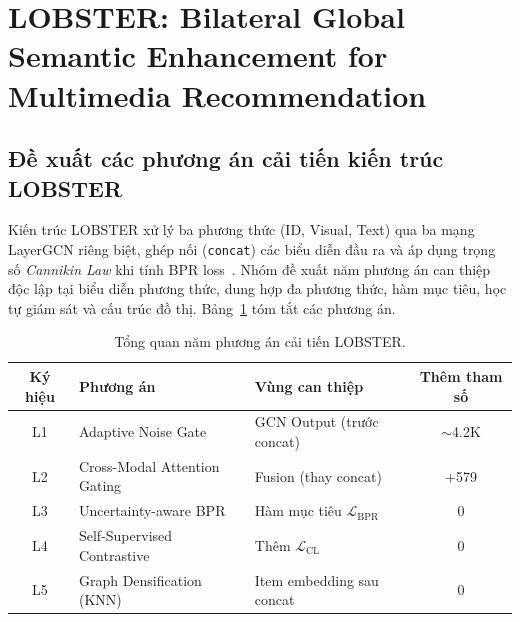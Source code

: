 
\section{LOBSTER: Bilateral Global Semantic Enhancement for Multimedia Recommendation}

\subsection{Đề xuất các phương án cải tiến kiến trúc LOBSTER}

Kiến trúc LOBSTER xử lý ba phương thức (ID, Visual, Text) qua ba mạng LayerGCN riêng biệt, ghép nối (\texttt{concat}) các biểu diễn đầu ra và áp dụng trọng số \textit{Cannikin Law} khi tính BPR loss~\cite{xu2026lobster}. Nhóm đề xuất năm phương án can thiệp độc lập tại biểu diễn phương thức, dung hợp đa phương thức, hàm mục tiêu, học tự giám sát và cấu trúc đồ thị. Bảng~\ref{tab:lobster_overview} tóm tắt các phương án.

\begin{table}[h]
\centering
\caption{Tổng quan năm phương án cải tiến LOBSTER.}
\label{tab:lobster_overview}
\begin{tabular}{c l l c}
\toprule
\textbf{Ký hiệu} & \textbf{Phương án} & \textbf{Vùng can thiệp} & \textbf{Thêm tham số} \\
\midrule
L1 & Adaptive Noise Gate            & GCN Output (trước concat) & $\sim$4.2K \\
L2 & Cross-Modal Attention Gating   & Fusion (thay concat)      & +579 \\
L3 & Uncertainty-aware BPR          & Hàm mục tiêu $\mathcal{L}_{\text{BPR}}$ & 0 \\
L4 & Self-Supervised Contrastive    & Thêm $\mathcal{L}_{\text{CL}}$ & 0 \\
L5 & Graph Densification (KNN)      & Item embedding sau concat & 0 \\
\bottomrule
\end{tabular}
\end{table}

